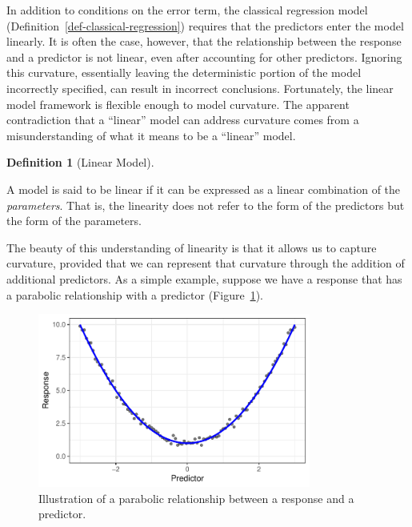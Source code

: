 \documentclass[
  letterpaper,
  DIV=11,
  numbers=noendperiod]{scrreprt}
\theoremstyle{definition}
\newtheorem{definition}{Definition}[chapter]
\theoremstyle{definition}
\theoremstyle{remark}
\begin{document}
\providecommand{\norm}[1]{\left\lVert#1\right\rVert}
\providecommand{\abs}[1]{\left\lvert#1\right\rvert}
\providecommand{\dist}[1]{\stackrel{\text{#1}}{\sim}}
\providecommand{\ind}[1]{\mathbb{I}\left(#1\right)}
\providecommand{\bm}[1]{\mathbf{#1}}
\providecommand{\bs}[1]{\boldsymbol{#1}}
\providecommand{\Ell}{\mathcal{L}}
\providecommand{\indep}{\perp\negthickspace\negmedspace\perp}

In addition to conditions on the error term, the classical regression
model (Definition~\ref{def-classical-regression}) requires that the
predictors enter the model linearly. It is often the case, however, that
the relationship between the response and a predictor is not linear,
even after accounting for other predictors. Ignoring this curvature,
essentially leaving the deterministic portion of the model incorrectly
specified, can result in incorrect conclusions. Fortunately, the linear
model framework is flexible enough to model curvature. The apparent
contradiction that a ``linear'' model can address curvature comes from a
misunderstanding of what it means to be a ``linear'' model.

\begin{definition}[Linear
Model]\protect\hypertarget{def-linear-model}{}\label{def-linear-model}

A model is said to be linear if it can be expressed as a linear
combination of the \emph{parameters}. That is, the linearity does not
refer to the form of the predictors but the form of the parameters.

\end{definition}

The beauty of this understanding of linearity is that it allows us to
capture curvature, provided that we can represent that curvature through
the addition of additional predictors. As a simple example, suppose we
have a response that has a parabolic relationship with a predictor
(Figure~\ref{fig-modeling-splines-parabola}).

\begin{figure}

{\centering \includegraphics[width=0.8\textwidth,height=\textheight]{./images/fig-modeling-splines-parabola-1.pdf}

}

\caption{\label{fig-modeling-splines-parabola}Illustration of a
parabolic relationship between a response and a predictor.}

\end{figure}
\end{document}

